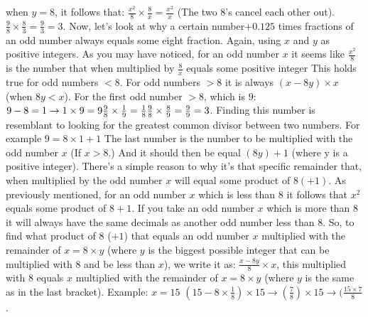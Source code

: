 \documentclass[12pt, a4paper]{article}
\begin{document}
\newline
\newline
when $y=8$, it follows that: $\frac{x^2}{8}\times\frac{8}{x}=\frac{x^2}{x}$ (The two $8$'s cancel each other out). \newline $\frac{9}{8}\times\frac{8}{3}= \frac{9}{3} = 3$. Now, let's look at why a certain number$+0.125$ times fractions of an odd number always equals some eight fraction. Again, using $x$ and $y$ as positive integers. As you may have noticed, for an odd number $x$ it seems like $\frac{x^2}{8}$ is the number that when multiplied by $\frac{8}{x}$ equals some positive integer This holds true for odd numbers $< 8$. For odd numbers $> 8$ it is always $(x-8y)\times x$ (when $8y < x$).
\newline
\newline
For the first odd number $> 8$, which is $9$: \newline
$9-8= 1 \rightarrow 1\times9= 9 \newline \frac{9}{8}\times\frac{1}{9} = \frac{1}{8} \newline \frac{9}{8}\times\frac{8}{9} = \frac{9}{9} = 3$. \newline
Finding this number is resemblant to looking for the greatest common divisor between two numbers. For example $9= 8\times1+1$ \newline
The last number is the number to be multiplied with the odd number $x$ (If $x > 8$.) And it should then be equal $(8y)+1$ (where y is a positive integer).\newline
There's a simple reason to why it's that specific remainder that, when multiplied by the odd number $x$ will equal some product of $8 (+1)$. As previously mentioned, for an odd number $x$ which is less than $8$ it follows that $x^2$ equals some product of $8+1$. 
If you take an odd number $x$ which is more than $8$ it will always have the same decimals as another odd number less than $8$.
\newline
\newline
So, to find what product of $8$ ($+1$) that equals an odd number $x$ multiplied with the remainder of $x= 8\times y$ (where $y$ is the biggest possible integer that can be multiplied with $8$ and be less than $x$), we write it as: $\frac{x-8y}{8}\times x$, this multiplied with $8$ equals $x$ multiplied with the remainder of $x= 8\times y$ (where $y$ is the same as in the last bracket).
\newline
\newline
Example: $x=15$ \newline $(15-8\times\frac{1}{8})\times 15 \rightarrow (\frac{7}{8})\times 15 \rightarrow (\frac{15\times7}{8}$.
\end{document}

